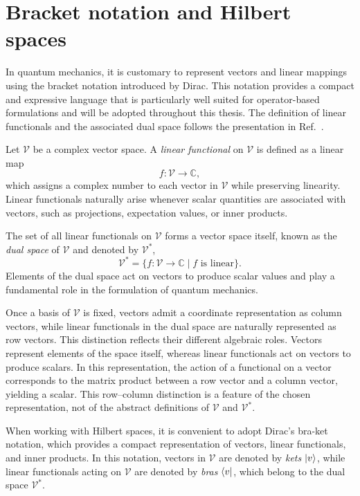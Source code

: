 \section{Bracket notation and Hilbert spaces}
\label{sec:brackets_hilbert}

In quantum mechanics, it is customary to represent vectors and linear mappings using the bracket notation introduced by Dirac. This notation provides a compact and expressive language that is particularly well suited for operator-based formulations and will be adopted throughout this thesis. The definition of linear functionals and the associated dual space follows the presentation in Ref.~\cite{Axler2015}.

Let $\mathcal{V}$ be a complex vector space. A \emph{linear functional} on $\mathcal{V}$ is defined as a linear map
\begin{equation}
    f : \mathcal{V} \to \mathbb{C},
\end{equation}
which assigns a complex number to each vector in $\mathcal{V}$ while preserving linearity. Linear functionals naturally arise whenever scalar quantities are associated with vectors, such as projections, expectation values, or inner products.

The set of all linear functionals on $\mathcal{V}$ forms a vector space itself, known as the \emph{dual space} of $\mathcal{V}$ and denoted by $\mathcal{V}^\ast$,
\begin{equation}
    \mathcal{V}^\ast = \{ f : \mathcal{V} \to \mathbb{C} \mid f \text{ is linear} \}.
\end{equation}
Elements of the dual space act on vectors to produce scalar values and play a fundamental role in the formulation of quantum mechanics.

Once a basis of $\mathcal{V}$ is fixed, vectors admit a coordinate representation as column vectors, while linear functionals in the dual space are naturally represented as row vectors. This distinction reflects their different algebraic roles. Vectors represent elements of the space itself, whereas linear functionals act on vectors to produce scalars. In this representation, the action of a functional on a vector corresponds to the matrix product between a row vector and a column vector, yielding a scalar. This row--column distinction is a feature of the chosen representation, not of the abstract definitions of $\mathcal{V}$ and $\mathcal{V}^\ast$.

When working with Hilbert spaces, it is convenient to adopt Dirac's bra-ket notation, which provides a compact representation of vectors, linear functionals, and inner products. In this notation, vectors in $\mathcal{V}$ are denoted by \emph{kets} $\ket{v}$, while linear functionals acting on $\mathcal{V}$ are denoted by \emph{bras} $\bra{v}$, which belong to the dual space $\mathcal{V}^\ast$.

